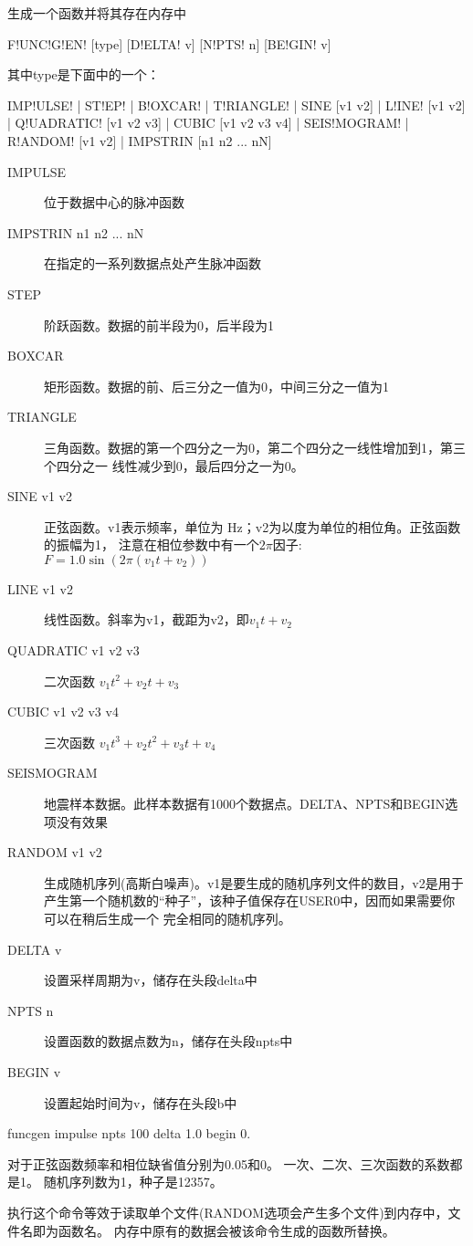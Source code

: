 \label{cmd:funcgen}

生成一个函数并将其存在内存中

\begin{SACSTX}
F!UNC!G!EN! [type] [D!ELTA! v] [N!PTS! n] [BE!GIN! v]
\end{SACSTX}
其中type是下面中的一个：
\begin{SACSTX}
IMP!ULSE! | ST!EP! | B!OXCAR! | T!RIANGLE! | SINE [v1 v2] | L!INE! [v1 v2] |
Q!UADRATIC! [v1 v2 v3] | CUBIC [v1 v2 v3 v4] | SEIS!MOGRAM! |
R!ANDOM! [v1 v2] | IMPSTRIN  [n1 n2 ... nN]
\end{SACSTX}

\begin{description}
\item [IMPULSE] 位于数据中心的脉冲函数
\item [IMPSTRIN n1 n2 ... nN] 在指定的一系列数据点处产生脉冲函数
\item [STEP] 阶跃函数。数据的前半段为0，后半段为1
\item [BOXCAR] 矩形函数。数据的前、后三分之一值为0，中间三分之一值为1
\item [TRIANGLE] 三角函数。数据的第一个四分之一为0，第二个四分之一线性增加到1，第三个四分之一
    线性减少到0，最后四分之一为0。
\item [SINE v1 v2] 正弦函数。v1表示频率，单位为 \si{\Hz}；v2为以度为单位的相位角。正弦函数的振幅为1，
    注意在相位参数中有一个$2\pi$因子: $F = 1.0 \sin (2\pi (v_1t+v_2))$
\item [LINE v1 v2] 线性函数。斜率为v1，截距为v2，即$ v_1 t + v_2 $
\item [QUADRATIC v1 v2 v3] 二次函数 $v_1 t^{2} + v_2 t + v_3 $
\item [CUBIC v1 v2 v3 v4] 三次函数 $ v_1 t^{3} + v_2 t^2 + v_3t + v_4 $
\item [SEISMOGRAM] 地震样本数据。此样本数据有1000个数据点。DELTA、NPTS和BEGIN选项没有效果
\item [RANDOM v1 v2] 生成随机序列(高斯白噪声)。v1是要生成的随机序列文件的数目，v2是用于
    产生第一个随机数的``种子''，该种子值保存在USER0中，因而如果需要你可以在稍后生成一个
    完全相同的随机序列。
\item [DELTA v] 设置采样周期为v，储存在头段delta中
\item [NPTS n] 设置函数的数据点数为n，储存在头段npts中
\item [BEGIN v] 设置起始时间为v，储存在头段b中
\end{description}

\begin{SACDFT}
funcgen impulse npts 100 delta 1.0 begin 0.
\end{SACDFT}
对于正弦函数频率和相位缺省值分别为0.05和0。
一次、二次、三次函数的系数都是1。
随机序列数为1，种子是12357。

执行这个命令等效于读取单个文件(RANDOM选项会产生多个文件)到内存中，文件名即为函数名。
内存中原有的数据会被该命令生成的函数所替换。

